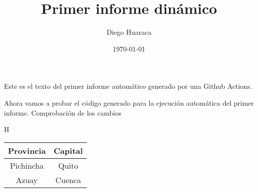 \documentclass[12pt, a4paper]{book}
\title{Primer informe dinámico}
\author{Diego Huaraca}
\date{\today}
\begin{document}
\maketitle

Este es el texto del primer informe automático generado por una Github Actions.\newline

Ahora vamos a probar el código generado para la ejecución automática del primer informe.
Comprobación de los cambios
\begin{table}{H}
\centering
\begin {tabular}{|c|c|}\hline
\textbf {Provincia} & \textbf {Capital}\\ \hline
Pichincha & Quito\\ \hline
Azuay & Cuenca\\ \hline 
\end {tabular}
\end{table}
\end{document}
